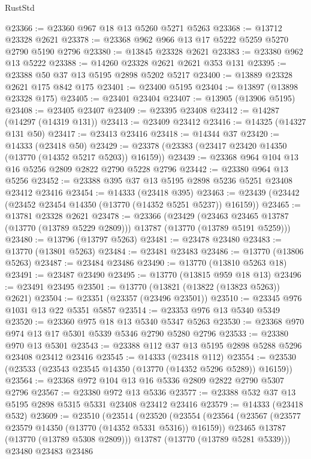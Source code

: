 \begin{lexlean}{RustStd}
\begin{coremodule}
@23366 := @23360 @967 @18 @13 @5260 @5271 @5263
@23368 := @13712 @23328 @2621
@23378 := @23368 @962 @966 @13 @17 @5222 @5259 @5270 @2790 @5190 @2796
@23380 := @13845 @23328 @2621
@23383 := @23380 @962 @13 @5222
@23388 := @14260 @23328 @2621 @2621 @353 @131
@23395 := @23388 @50 @37 @13 @5195 @2898 @5202 @5217
@23400 := @13889 @23328 @2621 @175 @842 @175
@23401 := @23400 @5195
@23404 := @13897 (@13898 @23328 @175)
@23405 := @23401 @23404
@23407 := @13905 (@13906 @5195)
@23408 := @23405 @23407
@23409 := @23395 @23408
@23412 := @14287 (@14297 (@14319 @131))
@23413 := @23409 @23412
@23416 := @14325 (@14327 @131 @50)
@23417 := @23413 @23416
@23418 := @14344 @37
@23420 := @14333 (@23418 @50)
@23429 := @23378 (@23383 (@23417 @23420 @14350 (@13770 (@14352 @5217 @5203)) @16159))
@23439 := @23368 @964 @104 @13 @16 @5256 @2809 @2822 @2790 @5228 @2796
@23442 := @23380 @964 @13 @5256
@23452 := @23388 @395 @37 @13 @5195 @2898 @5236 @5251 @23408 @23412 @23416
@23454 := @14333 (@23418 @395)
@23463 := @23439 (@23442 (@23452 @23454 @14350 (@13770 (@14352 @5251 @5237)) @16159))
@23465 := @13781 @23328 @2621
@23478 := @23366
    (@23429
      (@23463 @23465 @13787 (@13770 (@13789 @5229 @2809)))
      @13787
      (@13770 (@13789 @5191 @5259)))
@23480 := @13796 (@13797 @5263)
@23481 := @23478 @23480
@23483 := @13770 (@13801 @5263)
@23484 := @23481 @23483
@23486 := @13770 (@13806 @5263)
@23487 := @23484 @23486
@23490 := @13770 (@13810 @5263 @18)
@23491 := @23487 @23490
@23495 := @13770 (@13815 @959 @18 @13)
@23496 := @23491 @23495
@23501 := @13770 (@13821 (@13822 (@13823 @5263)) @2621)
@23504 := @23351 (@23357 (@23496 @23501))
@23510 := @23345 @976 @1031 @13 @22 @5351 @5857
@23514 := @23353 @976 @13 @5340 @5349
@23520 := @23360 @975 @18 @13 @5340 @5347 @5263
@23530 := @23368 @970 @974 @13 @17 @5301 @5339 @5346 @2790 @5280 @2796
@23533 := @23380 @970 @13 @5301
@23543 := @23388 @112 @37 @13 @5195 @2898 @5288 @5296 @23408 @23412 @23416
@23545 := @14333 (@23418 @112)
@23554 := @23530 (@23533 (@23543 @23545 @14350 (@13770 (@14352 @5296 @5289)) @16159))
@23564 := @23368 @972 @104 @13 @16 @5336 @2809 @2822 @2790 @5307 @2796
@23567 := @23380 @972 @13 @5336
@23577 := @23388 @532 @37 @13 @5195 @2898 @5315 @5331 @23408 @23412 @23416
@23579 := @14333 (@23418 @532)
@23609 := @23510
    (@23514
      (@23520
        (@23554
          (@23564
            (@23567 (@23577 @23579 @14350 (@13770 (@14352 @5331 @5316)) @16159))
            @23465
            @13787
            (@13770 (@13789 @5308 @2809)))
          @13787
          (@13770 (@13789 @5281 @5339)))
        @23480
        @23483
        @23486

\end{coremodule}
\end{lexlean}
